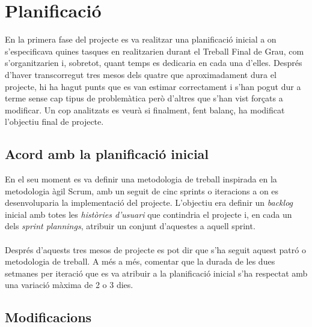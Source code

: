 
\chapter{Planificació} %

\label{Chapter3} %

En la primera fase del projecte es va realitzar una planificació inicial a on s'especificava quines tasques en realitzarien durant el Treball Final de Grau, com s'organitzarien i, sobretot, quant temps es dedicaria en cada una d'elles. Després d'haver transcorregut tres mesos dels quatre que aproximadament dura el projecte, hi ha hagut punts que es van estimar correctament i s'han pogut dur a terme sense cap tipus de problemàtica però d'altres que s'han vist forçats a modificar. Un cop analitzats es veurà si finalment, fent balanç, ha modificat l'objectiu final de projecte.

\section{Acord amb la planificació inicial}

En el seu moment es va definir una metodologia de treball inspirada en la metodologia àgil Scrum, amb un seguit de cinc sprints o iteracions a on es desenvoluparia la implementació del projecte. L'objectiu era definir un \textit{backlog} inicial amb totes les \textit{històries d'usuari} que contindria el projecte i, en cada un dels \textit{sprint plannings}, atribuir un conjunt d'aquestes a aquell sprint.
\\\\
Després d'aquests tres mesos de projecte es pot dir que s'ha seguit aquest patró o metodologia de treball. A més a més, comentar que la durada de les dues setmanes per iteració que es va atribuir a la planificació inicial s'ha respectat amb una variació màxima de 2 o 3 dies.


\section{Modificacions}

